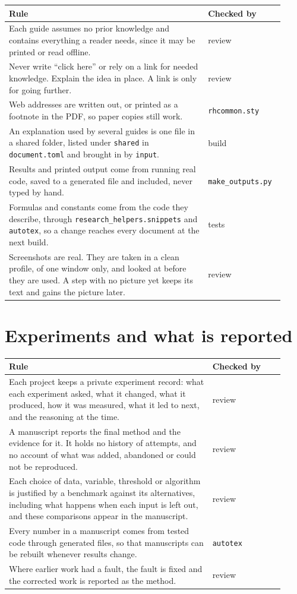 \begin{longtable}{p{0.68\linewidth}p{0.24\linewidth}}
\toprule
Rule & Checked by \\
\midrule
Each guide assumes no prior knowledge and contains everything a reader needs, since it may be printed or read offline. & review \\
Never write ``click here'' or rely on a link for needed knowledge. Explain the idea in place. A link is only for going further. & review \\
Web addresses are written out, or printed as a footnote in the PDF, so paper copies still work. & \texttt{rhcommon.sty} \\
An explanation used by several guides is one file in a shared folder, listed under \texttt{shared} in \texttt{document.toml} and brought in by \texttt{input}. & build \\
Results and printed output come from running real code, saved to a generated file and included, never typed by hand. & \texttt{make\_outputs.py} \\
Formulas and constants come from the code they describe, through \texttt{research\_helpers.snippets} and \texttt{autotex}, so a change reaches every document at the next build. & tests \\
Screenshots are real. They are taken in a clean profile, of one window only, and looked at before they are used. A step with no picture yet keeps its text and gains the picture later. & review \\
\bottomrule
\end{longtable}

\section{Experiments and what is reported}

\begin{longtable}{p{0.68\linewidth}p{0.24\linewidth}}
\toprule
Rule & Checked by \\
\midrule
Each project keeps a private experiment record: what each experiment asked, what it changed, what it produced, how it was measured, what it led to next, and the reasoning at the time. & review \\
A manuscript reports the final method and the evidence for it. It holds no history of attempts, and no account of what was added, abandoned or could not be reproduced. & review \\
Each choice of data, variable, threshold or algorithm is justified by a benchmark against its alternatives, including what happens when each input is left out, and these comparisons appear in the manuscript. & review \\
Every number in a manuscript comes from tested code through generated files, so that manuscripts can be rebuilt whenever results change. & \texttt{autotex} \\
Where earlier work had a fault, the fault is fixed and the corrected work is reported as the method. & review \\
\bottomrule
\end{longtable}

